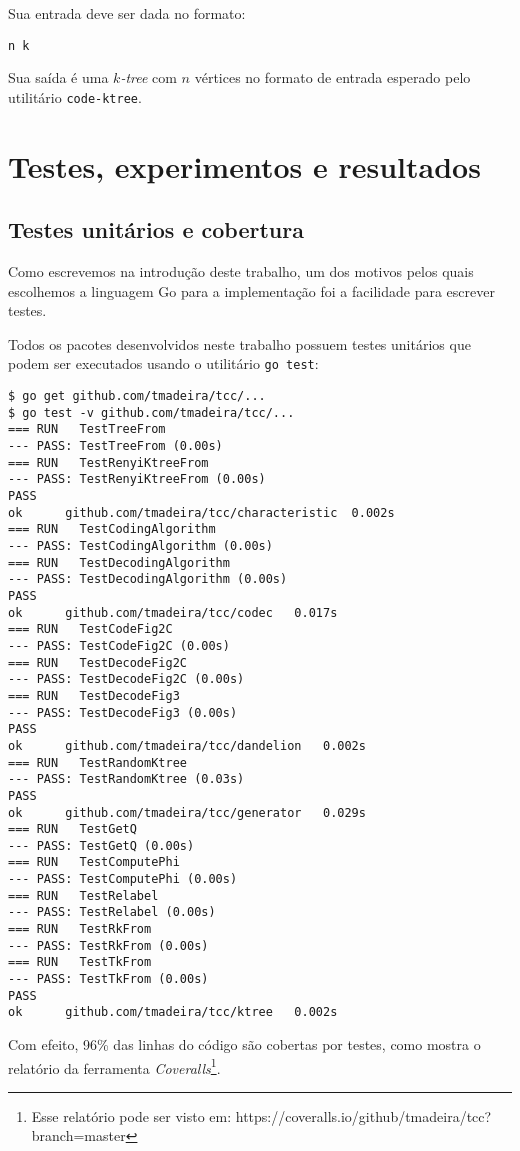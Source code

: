 Sua entrada deve ser dada no formato:

\begin{lstlisting}
n k
\end{lstlisting}

Sua saída é uma \emph{$k$-tree} com $n$ vértices no formato de entrada esperado pelo utilitário {\tt code-ktree}.

\section{Testes, experimentos e resultados}

\subsection{Testes unitários e cobertura}

Como escrevemos na introdução deste trabalho, um dos motivos pelos quais escolhemos a linguagem Go para a implementação foi a facilidade para escrever testes.

Todos os pacotes desenvolvidos neste trabalho possuem testes unitários que podem ser executados usando o utilitário {\tt go test}:

\begin{lstlisting}
$ go get github.com/tmadeira/tcc/...
$ go test -v github.com/tmadeira/tcc/...
=== RUN   TestTreeFrom
--- PASS: TestTreeFrom (0.00s)
=== RUN   TestRenyiKtreeFrom
--- PASS: TestRenyiKtreeFrom (0.00s)
PASS
ok  	github.com/tmadeira/tcc/characteristic	0.002s
=== RUN   TestCodingAlgorithm
--- PASS: TestCodingAlgorithm (0.00s)
=== RUN   TestDecodingAlgorithm
--- PASS: TestDecodingAlgorithm (0.00s)
PASS
ok  	github.com/tmadeira/tcc/codec	0.017s
=== RUN   TestCodeFig2C
--- PASS: TestCodeFig2C (0.00s)
=== RUN   TestDecodeFig2C
--- PASS: TestDecodeFig2C (0.00s)
=== RUN   TestDecodeFig3
--- PASS: TestDecodeFig3 (0.00s)
PASS
ok  	github.com/tmadeira/tcc/dandelion	0.002s
=== RUN   TestRandomKtree
--- PASS: TestRandomKtree (0.03s)
PASS
ok  	github.com/tmadeira/tcc/generator	0.029s
=== RUN   TestGetQ
--- PASS: TestGetQ (0.00s)
=== RUN   TestComputePhi
--- PASS: TestComputePhi (0.00s)
=== RUN   TestRelabel
--- PASS: TestRelabel (0.00s)
=== RUN   TestRkFrom
--- PASS: TestRkFrom (0.00s)
=== RUN   TestTkFrom
--- PASS: TestTkFrom (0.00s)
PASS
ok  	github.com/tmadeira/tcc/ktree	0.002s
\end{lstlisting}

Com efeito, 96\% das linhas do código são cobertas por testes, como mostra o relatório da ferramenta \emph{Coveralls}\footnote{Esse relatório pode ser visto em: https://coveralls.io/github/tmadeira/tcc?branch=master}.

